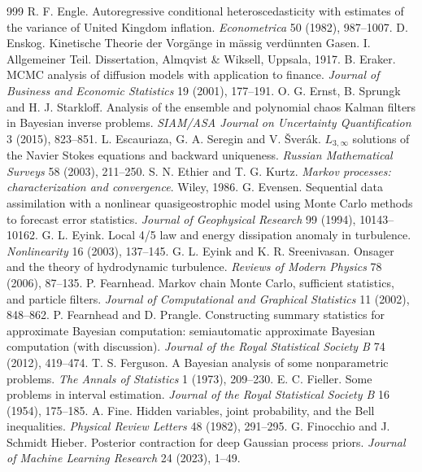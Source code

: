\begin{thebibliography}{999}
 R. F. Engle. Autoregressive conditional heteroscedasticity with estimates of the variance of United Kingdom inflation. \emph{Econometrica} 50 (1982), 987--1007.
 D. Enskog. Kinetische Theorie der Vorg\"ange in m\"assig verd\"unnten Gasen. I. Allgemeiner Teil. Dissertation, Almqvist \& Wiksell, Uppsala, 1917.
 B. Eraker. MCMC analysis of diffusion models with application to finance. \emph{Journal of Business and Economic Statistics} 19 (2001), 177--191.
 O. G. Ernst, B. Sprungk and H. J. Starkloff. Analysis of the ensemble and polynomial chaos Kalman filters in Bayesian inverse problems. \emph{SIAM/ASA Journal on Uncertainty Quantification} 3 (2015), 823--851.
 L. Escauriaza, G. A. Seregin and V. \v{S}ver\'ak. $L_{3,\infty}$ solutions of the Navier Stokes equations and backward uniqueness. \emph{Russian Mathematical Surveys} 58 (2003), 211--250.
 S. N. Ethier and T. G. Kurtz. \emph{Markov processes: characterization and convergence}. Wiley, 1986.
 G. Evensen. Sequential data assimilation with a nonlinear quasigeostrophic model using Monte Carlo methods to forecast error statistics. \emph{Journal of Geophysical Research} 99 (1994), 10143--10162.
 G. L. Eyink. Local 4/5 law and energy dissipation anomaly in turbulence. \emph{Nonlinearity} 16 (2003), 137--145.
 G. L. Eyink and K. R. Sreenivasan. Onsager and the theory of hydrodynamic turbulence. \emph{Reviews of Modern Physics} 78 (2006), 87--135.
 P. Fearnhead. Markov chain Monte Carlo, sufficient statistics, and particle filters. \emph{Journal of Computational and Graphical Statistics} 11 (2002), 848--862.
 P. Fearnhead and D. Prangle. Constructing summary statistics for approximate Bayesian computation: semiautomatic approximate Bayesian computation (with discussion). \emph{Journal of the Royal Statistical Society B} 74 (2012), 419--474.
 T. S. Ferguson. A Bayesian analysis of some nonparametric problems. \emph{The Annals of Statistics} 1 (1973), 209--230.
 E. C. Fieller. Some problems in interval estimation. \emph{Journal of the Royal Statistical Society B} 16 (1954), 175--185.
 A. Fine. Hidden variables, joint probability, and the Bell inequalities. \emph{Physical Review Letters} 48 (1982), 291--295.
 G. Finocchio and J. Schmidt Hieber. Posterior contraction for deep Gaussian process priors. \emph{Journal of Machine Learning Research} 24 (2023), 1--49.

\end{thebibliography}
